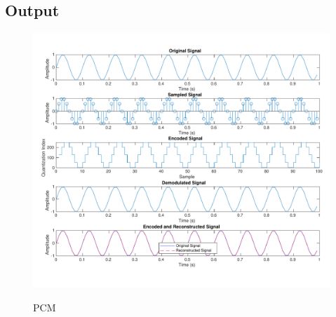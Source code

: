 \pagebreak
\subsection{Output}

\begin{figure}[!htb]
      \centering
      \includegraphics[width=\textwidth]{res/figures/pcm_no_quantization.pdf}
      \label{output:pcm}
      \caption{PCM}
\end{figure}
